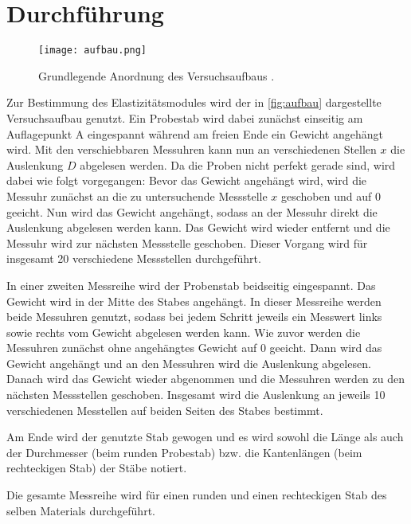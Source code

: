 \section{Durchführung}
\label{sec:Durchführung}
\begin{figure}[h]
    \centering
    \texttt{[image: aufbau.png]}
    \caption{Grundlegende Anordnung des Versuchsaufbaus \cite{V103}.}
    \label{fig:aufbau}
\end{figure}
Zur Bestimmung des Elastizitätsmodules wird der in \autoref{fig:aufbau} dargestellte Versuchsaufbau genutzt.
Ein Probestab wird dabei zunächst einseitig am Auflagepunkt A eingespannt während am freien Ende ein Gewicht angehängt wird.
Mit den verschiebbaren Messuhren kann nun an verschiedenen Stellen $x$ die Auslenkung $D$ abgelesen werden. Da die
Proben nicht perfekt gerade sind, wird dabei wie folgt vorgegangen:
Bevor das Gewicht angehängt wird, wird die Messuhr zunächst an die zu untersuchende Messstelle $x$ geschoben und auf $0$ geeicht.
Nun wird das Gewicht angehängt, sodass an der Messuhr direkt die Auslenkung abgelesen werden kann. Das Gewicht wird wieder entfernt
und die Messuhr wird zur nächsten Messstelle geschoben. Dieser Vorgang wird für insgesamt 20 verschiedene Messstellen durchgeführt.

\noindent In einer zweiten Messreihe wird der Probenstab beidseitig eingespannt. Das Gewicht wird in der Mitte des Stabes angehängt. In dieser
Messreihe werden beide Messuhren genutzt, sodass bei jedem Schritt jeweils ein Messwert links sowie rechts vom Gewicht abgelesen werden kann.
Wie zuvor werden die Messuhren zunächst ohne angehängtes Gewicht auf 0 geeicht. Dann wird das Gewicht angehängt und an den Messuhren wird die Auslenkung abgelesen.
Danach wird das Gewicht wieder abgenommen und die Messuhren werden zu den nächsten Messstellen geschoben. Insgesamt wird die Auslenkung an jeweils 10 verschiedenen
Messtellen auf beiden Seiten des Stabes bestimmt.

\noindent Am Ende wird der genutzte Stab gewogen und es wird sowohl die Länge als auch der Durchmesser (beim runden Probestab) bzw. die Kantenlängen (beim rechteckigen Stab)
der Stäbe notiert.

\noindent Die gesamte Messreihe wird für einen runden und einen rechteckigen Stab des selben Materials durchgeführt.